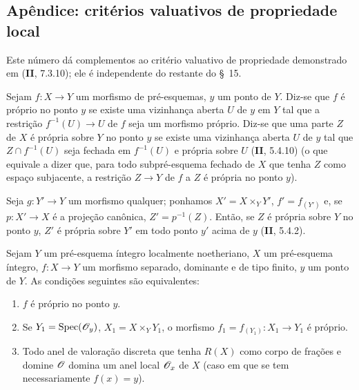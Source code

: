 \subsection{Apêndice: critérios valuativos de propriedade local}
\label{subsection:IV.15.7}

Este número dá complementos ao critério valuativo de propriedade demonstrado em (\textbf{II}, 7.3.10); ele é independente do restante do \S~15.

\begin{definition}[15.7.1]
\label{IV.15.7.1}
Sejam $f:X\to Y$ um morfismo de pré-esquemas, $y$ um ponto de $Y$. Diz-se que $f$ é próprio no ponto $y$ se existe uma vizinhança aberta $U$ de $y$ em $Y$ tal que a restrição $f^{-1}(U)\to U$ de $f$ seja um morfismo próprio. Diz-se que uma parte $Z$ de $X$ é própria sobre $Y$ no ponto $y$ se existe uma vizinhança aberta $U$ de $y$ tal que $Z\cap f^{-1}(U)$ seja fechada em $f^{-1}(U)$ e própria sobre $U$ (\textbf{II}, 5.4.10) (o que equivale a dizer que, para todo subpré-esquema fechado de $X$ que tenha $Z$ como espaço subjacente, a restrição $Z\to Y$ de $f$ a $Z$ é própria no ponto $y$).
\end{definition}

Seja $g:Y'\to Y$ um morfismo qualquer; ponhamos $X'=X\times_Y Y'$, $f'=f_{(Y')}$ e, se $p:X'\to X$ é a projeção canônica, $Z'=p^{-1}(Z)$. Então, se $Z$ é própria sobre $Y$ no ponto $y$, $Z'$ é própria sobre $Y'$ em todo ponto $y'$ acima de $y$ (\textbf{II}, 5.4.2).

\begin{proposition}[15.7.2]
\label{IV.15.7.2}
Sejam $Y$ um pré-esquema íntegro localmente noetheriano, $X$ um pré-esquema íntegro, $f:X\to Y$ um morfismo separado, dominante e de tipo finito, $y$ um ponto de $Y$. As condições seguintes são equivalentes:
\begin{enumerate}[label=\emph{\alph*)}]
  \item $f$ é próprio no ponto $y$.
  \item Se $Y_1=\operatorname{Spec}(\mathscr{O}_y)$, $X_1=X\times_Y Y_1$, o morfismo $f_1=f_{(Y_1)}:X_1\to Y_1$ é próprio.
  \item Todo anel de valoração discreta que tenha $R(X)$ como corpo de frações e domine $\mathscr{O}$ domina um anel local $\mathscr{O}_x$ de $X$ (caso em que se tem necessariamente $f(x)=y$).
\end{enumerate}
\end{proposition}

